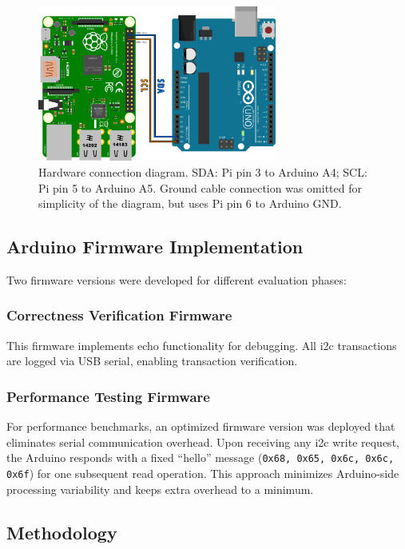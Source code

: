 \begin{figure}[h]
	\centering
	\includegraphics[width=0.7\textwidth]{images/HW_config.png}
	\caption{Hardware connection diagram. SDA: Pi pin 3 to Arduino A4; SCL: Pi pin 5 to Arduino A5. Ground cable connection was omitted for simplicity of the diagram, but uses Pi pin 6 to Arduino GND.}
	\label{fig:hw-connection}
\end{figure}

\subsection{Arduino Firmware Implementation}
\label{subsec:eval-setup-fw}

Two firmware versions were developed for different evaluation phases:

\subsubsection{Correctness Verification Firmware}
This firmware implements echo functionality for debugging. All \acrshort{i2c} transactions are logged via USB serial, enabling transaction verification.

\subsubsection{Performance Testing Firmware}
For performance benchmarks, an optimized firmware version was deployed that eliminates serial communication overhead. Upon receiving any \acrshort{i2c} write request, the Arduino responds with a fixed ``hello'' message (\texttt{0x68, 0x65, 0x6c, 0x6c, 0x6f}) for one subsequent read operation. This approach minimizes Arduino-side processing variability and keeps extra overhead to a minimum.

\subsection{Methodology}
\label{subsec:eval-setup-bench}

